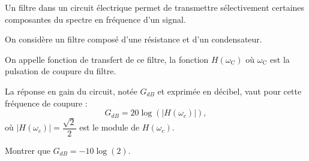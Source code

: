 \medskip

Un filtre dans un circuit électrique permet de transmettre sélectivement certaines composantes du spectre en fréquence d'un signal.

On considère un filtre composé d'une résistance et d'un condensateur.

On appelle fonction de transfert de ce filtre, la fonction $H(\omega_{\text{C}})$ où $\omega_{\text{C}}$ est la pulsation de coupure du filtre.

La réponse en gain du circuit, notée $G_{dB}$ et exprimée en décibel, vaut pour cette fréquence de coupure :
\[G_{dB} = 20 \log \left(\left|H\left(\omega_{c}\right)\right|\right),\]
où $\left|H\left(\omega_{c}\right)\right| = \dfrac{\sqrt{2}}{2}$ est le module de $H\left(\omega_{c}\right)$.

Montrer que $G_{dB} = -10 \log (2)$.

\bigskip
